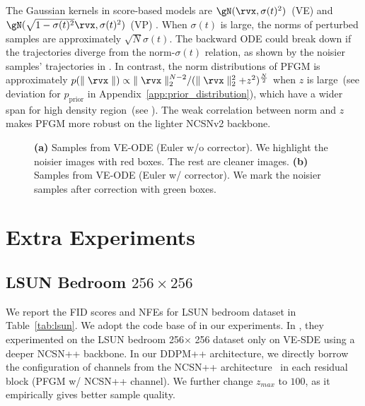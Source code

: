 The Gaussian kernels in score-based models are $\gN(\rvx, \sigma(t)^2)$~(VE) and $\gN(\sqrt{1-\sigma(t)^2}\rvx,\sigma(t)^2)$~(VP) \cite{Song2021ScoreBasedGM}. When $\sigma(t)$ is large, the norms of perturbed samples are approximately $\sqrt{N}\sigma(t)$. The backward ODE could break down if the trajectories diverge from the norm-$\sigma(t)$ relation, as shown by the noisier samples' trajectories in . In contrast, the norm distributions of PFGM is approximately $p(\parallel\rvx\parallel)\propto {\parallel \rvx \parallel_2^{N-2}}/{(\parallel \rvx \parallel_2^2+z^2)^{\frac{N}{2}}}$ when $z$ is large~(see deviation for $p_{\textrm{prior}}$ in Appendix~\ref{app:prior_distribution}), which have a wider span for high density region~(see ). The weak correlation between norm and $z$ makes PFGM more robust on the lighter NCSNv2 backbone.


\begin{figure*}
    \centering
    \hspace{10pt}
    \caption{\textbf{(a)} Samples from VE-ODE (Euler w/o corrector). We highlight the noisier images with red boxes. The rest are cleaner images. \textbf{(b)} Samples from VE-ODE (Euler w/ corrector). We mark the noisier samples after correction with green boxes.}
\end{figure*}

\section{Extra Experiments}
\label{app:extra-exp}
\subsection{LSUN Bedroom $256\times 256$}
\label{app:exp-lsun}
We report the FID scores and NFEs for LSUN bedroom dataset in Table~\ref{tab:lsun}. We adopt the code base of \cite{Song2021ScoreBasedGM} in our experiments. In \cite{Song2021ScoreBasedGM}, they experimented on the LSUN bedroom 256$\times$ 256 dataset only on VE-SDE using a deeper NCSN++ backbone. In our DDPM++ architecture, we directly borrow the configuration of channels from the NCSN++ architecture~\cite{Song2021ScoreBasedGM} in each residual block (PFGM w/ NCSN++ channel). We further change $z_{max}$ to $100$, as it empirically gives better sample quality.

